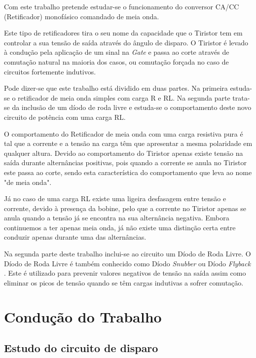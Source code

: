 \documentclass[a4paper,11pt]{article}
\numberwithin{equation}{section}
\begin{document}
Com este trabalho pretende estudar-se o funcionamento do conversor CA/CC (Retificador) monofásico comandado de meia onda.

Este tipo de retificadores tira o seu nome da capacidade que o Tiristor tem em controlar a sua tensão de saída através do ângulo de disparo. O Tiristor é levado à condução pela aplicação de um sinal na \textit{Gate} e passa ao corte através de comutação natural na maioria dos casos, ou comutação forçada no caso de circuitos fortemente indutivos. \cite{Rashid}

Pode dizer-se que este trabalho está dividido em duas partes. Na primeira estuda-se o retificador de meia onda simples com carga R e RL. Na segunda parte trata-se da inclusão de um díodo de roda livre e estuda-se o comportamento deste novo circuito de potência com uma carga RL.

O comportamento do Retificador de meia onda com uma carga resistiva pura é tal que a corrente e a tensão na carga têm que apresentar a mesma polaridade em qualquer altura. Devido ao comportamento do Tiristor apenas existe tensão na saída durante alternâncias positivas, pois quando a corrente se anula no Tiristor este passa ao corte, sendo esta característica do comportamento que leva ao nome "de meia onda". \cite{Kassakian}

Já no caso de uma carga RL existe uma ligeira desfasagem entre tensão e corrente, devido à presença da bobine, pelo que a corrente no Tiristor apenas se anula quando a tensão já se encontra na sua alternância negativa. Embora continuemos a ter apenas meia onda, já não existe uma distinção certa entre conduzir apenas durante uma das alternâncias. \cite{Kassakian}

Na segunda parte deste trabalho inclui-se ao circuito um Díodo de Roda Livre. O Díodo de Roda Livre é também conhecido como Díodo \textit{Snubber} ou Díodo \textit{Flyback} \cite{Silva}. Este é utilizado para prevenir valores negativos de tensão na saída assim como eliminar os picos de tensão quando se têm cargas indutivas a sofrer comutação. \cite{Kassakian}



\section{Condução do Trabalho}

\subsection{Estudo do circuito de disparo}
\end{document}
